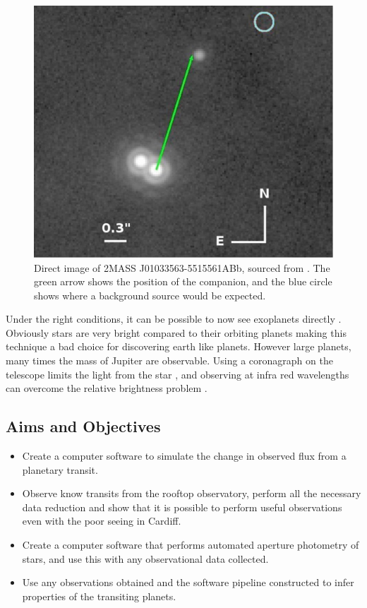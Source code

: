 \begin{figure}[ht]
    \centering
    \includegraphics[width=\figwidth]{images/direct_image.png}
    \caption{Direct image of 2MASS J01033563-5515561ABb, sourced from \cite{delorme2013direct}. The green arrow shows the position of the companion, and the blue circle shows where a background source would be expected.}
    \label{fig:direct}
\end{figure}

Under the right conditions, it can be possible to now see exoplanets directly \citep{lafreniere2010directly,kuzuhara2013direct,delorme2013direct}. Obviously stars are very bright compared to their orbiting planets making this technique a bad choice for discovering earth like planets. However large planets, many times the mass of Jupiter are observable. Using a coronagraph on the telescope limits the light from the star \citep{kuchner2002coronagraph}, and observing at infra red wavelengths can overcome the relative brightness problem \citep{delorme2013direct}.

\subsection{Aims and Objectives}
\begin{itemize}
\item Create a computer software to simulate the change in observed flux from a planetary transit.
\item Observe know transits from the rooftop observatory, perform all the necessary data reduction and show that it is possible to perform useful observations even with the poor seeing in Cardiff.
\item Create a computer software that performs automated aperture photometry of stars, and use this with any observational data collected.
\item Use any observations obtained and the software pipeline constructed to infer properties of the transiting planets.
\end{itemize}